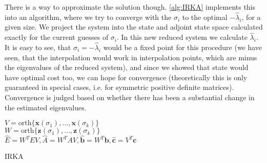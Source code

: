 \documentclass{article}
\begin{document}
	 There is a way to approximate the solution though. \autoref{alg:IRKA} implements this into an algorithm, where we try to converge with the $\sigma_i$ to the optimal $-\hat{\lambda}_i$, for a given size. We project the system into the state and adjoint state space calculated exactly for the current guesses of $\sigma_i$. In this new reduced system we calculate $\hat{\lambda}_i$. It is easy to see, that $\sigma_i = -\hat{\lambda}_i$ would be a fixed point for this procedure (we have seen, that the interpolation would work in interpolation points, which are minus the eigenvalues of the reduced system), and since we showed that state would have optimal cost too, we can hope for convergence (theoretically this is only guaranteed in special cases, i.e. for symmetric positive definite matrices). Convergence is judged based on whether there has been a substantial change in the estimated eigenvalues.
	\begin{algorithm2e}[ht]
		\SetAlgoLined
		$V=\text{orth}\{\mathbf{x}(\sigma_1),\ldots,\mathbf{x}(\sigma_k)\}$\\
		$W=\text{orth}\{\mathbf{z}(\sigma_1),\ldots,\mathbf{z}(\sigma_k)\}$\\
		$\hat{E}=W^{T}EV, \hat{A}=W^{T}AV, \hat{\mathbf{b}}=W^T\mathbf{b},\hat{\mathbf{c}}=V^T\mathbf{c}$
		\caption{IRKA}
		\label{alg:IRKA}
	\end{algorithm2e}
	
\end{document}
